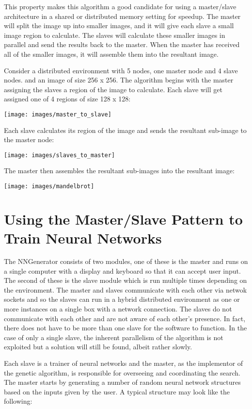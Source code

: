This property makes this algorithm a good candidate for using a master/slave architecture in a shared or distributed memory setting for speedup. 
The master will split the image up into smaller images, and it will give each slave a small image region to calculate. 
The slaves will calculate these smaller images in parallel and send the results back to the master. 
When the master has received all of the smaller images, it will assemble them into the resultant image.

Consider a distributed environment with 5 nodes, one master node and 4 slave nodes. and an image of size 256 x 256. 
The algorithm begins with the master assigning the slaves a region of the image to calculate. 
Each slave will get assigned one of 4 regions of size 128 x 128:

\texttt{[image: images/master\_to\_slave]}

\newpage
Each slave calculates its region of the image and sends the resultant sub-image to the master node:

\texttt{[image: images/slaves\_to\_master]}
\newpage

The master then assembles the resultant sub-images into the resultant image: 

\texttt{[image: images/mandelbrot]}

\section{Using the Master/Slave Pattern to Train Neural Networks}
The NNGenerator consists of two modules, one of these is the master and runs on a single computer with a display and keyboard so that it can accept user input.
The second of these is the slave module which is run multiple times depending on the environment.
The master and slaves communicate with each other via netwok sockets and so the slaves can run in a hybrid distributed environment as one or more instances on a single box with a network connection.
The slaves do not communicate with each other and are not aware of each other's presence.
In fact, there does not have to be more than one slave for the software to function.
In the case of only a single slave, the inherent parallelism of the algorithm is not exploited but a solution will still be found, albeit rather slowly.

Each slave is a trainer of neural networks and the master, as the implementor of the genetic algorithm, is responsible for overseeing and coordinating the search.
The master starts by generating a number of random neural network structures based on the inputs given by the user.
A typical structure may look like the following:

